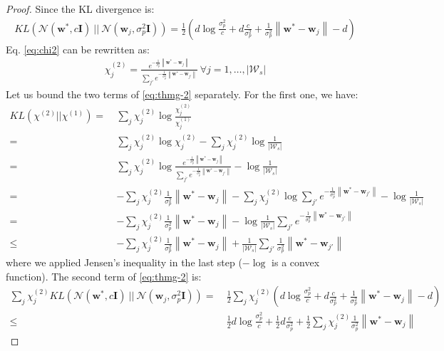 \documentclass{article}
\newcommand{\norm}[1]{\left\lVert #1 \right\rVert}
\newcommand{\abs}[1]{\left\lvert #1 \right\rvert}
\begin{document}
\begin{proof}
Since the KL divergence is:
\begin{align*}
KL(\mathcal{N}(\bm{w}^*,c\bm{I})\ ||\ \mathcal{N}(\bm{w}_j, \sigma_p^2\bm{I})) = \frac{1}{2}\left( d\log\frac{\sigma^2_p}{c} + d\frac{c}{\sigma^2_p} + \frac{1}{\sigma^2_p}\norm{\bm{w}^* - \bm{w}_j} - d\right)
\end{align*}
Eq. \ref{eq:chi2} can be rewritten as:
\begin{align*}
\chi^{(2)}_j = \frac{e^{-\frac{1}{\sigma^2_p}\norm{\bm{w}^* - \bm{w}_j}}}{\sum_{j'}e^{-\frac{1}{\sigma^2_p}\norm{\bm{w}^* - \bm{w}_{j'}}}}\ \forall j = 1,\dots,\abs{\mathcal{W}_s}
\end{align*}
Let us bound the two terms of \eqref{eq:thmg-2} separately. For the first one, we have:
\begin{align*}
KL(\chi^{(2)}||\chi^{(1)}) =\ & \sum_j \chi^{(2)}_j \log\frac{\chi^{(2)}_j}{\chi^{(1)}_j}\\ =\ & \sum_j \chi^{(2)}_j \log\chi^{(2)}_j - \sum_j \chi^{(2)}_j \log\frac{1}{\abs{\mathcal{W}_s}}\\ =\ & \sum_j \chi^{(2)}_j \log\frac{e^{-\frac{1}{\sigma^2_p}\norm{\bm{w}^* - \bm{w}_j}}}{\sum_{j'}e^{-\frac{1}{\sigma^2_p}\norm{\bm{w}^* - \bm{w}_{j'}}}} - \log\frac{1}{\abs{\mathcal{W}_s}}\\ =\ & -\sum_j \chi^{(2)}_j \frac{1}{\sigma^2_p}\norm{\bm{w}^* - \bm{w}_j} - \sum_j \chi^{(2)}_j \log\sum_{j'}e^{-\frac{1}{\sigma^2_p}\norm{\bm{w}^* - \bm{w}_{j'}}} - \log\frac{1}{\abs{\mathcal{W}_s}}\\ =\ & -\sum_j \chi^{(2)}_j \frac{1}{\sigma^2_p}\norm{\bm{w}^* - \bm{w}_j} - \log\frac{1}{\abs{\mathcal{W}_s}}\sum_{j'}e^{-\frac{1}{\sigma^2_p}\norm{\bm{w}^* - \bm{w}_{j'}}}\\ \leq\ & -\sum_j \chi^{(2)}_j \frac{1}{\sigma^2_p}\norm{\bm{w}^* - \bm{w}_j} + \frac{1}{\abs{\mathcal{W}_s}}\sum_{j'}\frac{1}{\sigma^2_p}\norm{\bm{w}^* - \bm{w}_{j'}}
\end{align*}
where we applied Jensen's inequality in the last step ($-\log$ is a convex function). The second term of \eqref{eq:thmg-2} is:
\begin{align*}
\sum_{j} \chi^{(2)}_{j}KL(\mathcal{N}(\bm{w}^*,c\bm{I})\ ||\ \mathcal{N}(\bm{w}_j, \sigma_p^2\bm{I})) =\ & \frac{1}{2}\sum_{j} \chi^{(2)}_{j}\left( d\log\frac{\sigma^2_p}{c} + d\frac{c}{\sigma^2_p} + \frac{1}{\sigma^2_p}\norm{\bm{w}^* - \bm{w}_j} - d\right)\\ \leq\ & \frac{1}{2}d\log\frac{\sigma^2_p}{c} + \frac{1}{2}d\frac{c}{\sigma^2_p} + \frac{1}{2}\sum_{j} \chi^{(2)}_{j}\frac{1}{\sigma^2_p}\norm{\bm{w}^* - \bm{w}_j}

\end{align*}
\end{proof}
\end{document}
